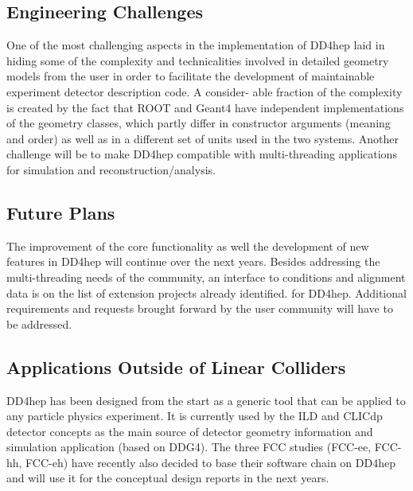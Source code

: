 \subsection{Engineering Challenges}
One of the most challenging aspects in the implementation of DD4hep laid in hiding some of the complexity and technicalities involved in detailed geometry models from the user in order to facilitate the development of maintainable experiment detector description code. A consider- able fraction of the complexity is created by the fact that ROOT and Geant4 have independent implementations of the geometry classes, which partly differ in constructor arguments (meaning and order) as well as in a different set of units used in the two systems. Another challenge will be to make DD4hep compatible with multi-threading applications for simulation and reconstruction/analysis.

\subsection{Future Plans}
The improvement of the core functionality as well the development of new features in DD4hep will continue over the next years. Besides addressing the multi-threading needs of the community, an interface to conditions and alignment data is on the list of extension projects already identified. for DD4hep. Additional requirements and requests brought forward by the user community will have to be addressed.

\subsection{Applications Outside of Linear Colliders}
DD4hep has been designed from the start as a generic tool that can be applied to any particle physics experiment. It is currently used by the ILD and CLICdp detector concepts as the main source of detector geometry information and simulation application (based on DDG4). The three FCC studies (FCC-ee, FCC-hh, FCC-eh) have recently also decided to base their software chain on DD4hep and will use it for the conceptual design reports in the next years.
